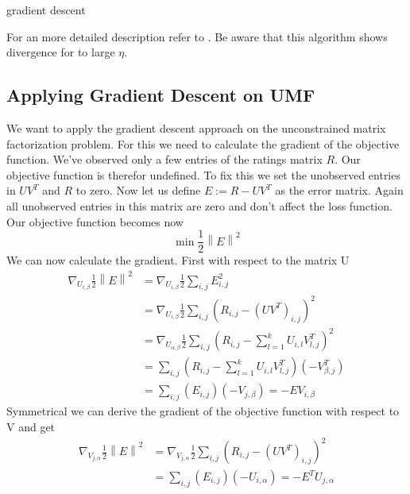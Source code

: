\documentclass[DIV=14,twocolumn]{scrartcl}
\newcommand{\norm}[1]{\left\lVert#1\right\rVert}
\begin{document}
\begin{algorithm}
	\caption{gradient descent}
	\label{algo:gd}

\end{algorithm}
For an more detailed description refer to \cite{ShSh14}.
Be aware that this algorithm shows divergence for to large $\eta$. 

\subsection{Applying Gradient Descent on UMF} 
We want to apply the gradient descent approach on the unconstrained matrix factorization problem. For this we need to calculate the gradient of the objective function. We've observed only a few entries of the ratings matrix $R$. Our objective function is therefor undefined. To fix this we set the unobserved entries in $UV^T$ and $R$ to zero. 
Now let us define $E:=R-UV^T$ as the error matrix. Again all unobserved entries in this matrix are zero and don't affect the loss function. Our objective function becomes now \[\min\frac{1}{2}\norm{E}^2\]
We can now calculate the gradient.
First with respect to the matrix U
\begin{equation*}
\begin{split}
\nabla_{U_{i,\beta}} \frac{1}{2}\norm{E}^2 &= \nabla_{U_{i,\beta}} \frac{1}{2}\sum_{i,j}E_{i,j}^2 \\ &=\nabla_{U_{i,\beta}} \frac{1}{2}\sum_{i,j}(R_{i,j}-(UV^T)_{i,j})^2 \\
&=\nabla_{U_{\alpha,\beta}} \frac{1}{2}\sum_{i,j}(R_{i,j}-\sum_{l=1}^k U_{i,l}V^T_{l,j})^2\\
&=\sum_{i,j}(R_{i,j}-\sum_{l=1}^k U_{i,l}V^T_{l,j})(-V^T_{\beta,j})\\
&=\sum_{i,j}(E_{i,j})(-V_{j,\beta})=-EV_{i,\beta} 
\end{split}
\end{equation*}
Symmetrical we can derive the gradient of the objective function with respect to V and get 
\begin{equation*}
\begin{split}
\nabla_{V_{j,\alpha}} \frac{1}{2}\norm{E}^2 &= \nabla_{V_{j,\alpha}} \frac{1}{2}\sum_{i,j}(R_{i,j}-(UV^T)_{i,j})^2\\
&=\sum_{i,j}(E_{i,j})(-U_{i,\alpha})=-E^TU_{j,\alpha}
\end{split}
\end{equation*}
\end{document}
